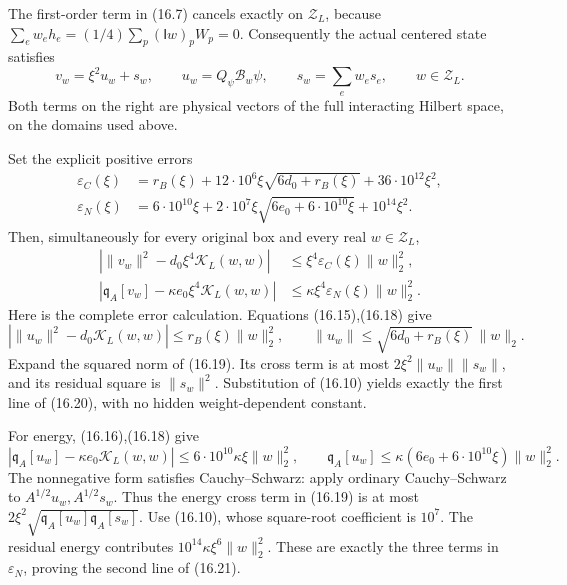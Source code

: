 \documentclass[
]{article}
\begin{document}
The first-order term in (16.7) cancels exactly on \(\mathscr Z_L\),
because \(\sum_e w_eh_e=(1/4)\sum_p(\mathsf Iw)_pW_p=0\). Consequently
the actual centered state satisfies \[
v_w=\xi^2u_w+s_w,\qquad
u_w=Q_\psi\mathcal B_w\psi,\qquad
s_w=\sum_e w_es_e,\qquad w\in\mathscr Z_L.                   \tag{16.19}
\] Both terms on the right are physical vectors of the full interacting
Hilbert space, on the domains used above.

Set the explicit positive errors \[
\begin{split}
\varepsilon_C(\xi)
 &=r_B(\xi)+12\cdot10^6\xi\sqrt{6d_0+r_B(\xi)}
                              +36\cdot10^{12}\xi^2,\\
\varepsilon_N(\xi)
 &=6\cdot10^{10}\xi
   +2\cdot10^7\xi\sqrt{6e_0+6\cdot10^{10}\xi}
                              +10^{14}\xi^2.
\end{split}                                                  \tag{16.20}
\] Then, simultaneously for every original box and every real
\(w\in\mathscr Z_L\), \[
\begin{split}
\left|\|v_w\|^2-d_0\xi^4\mathcal K_L(w,w)\right|
 &\le\xi^4\varepsilon_C(\xi)\|w\|_2^2,\\
\left|\mathfrak q_A[v_w]
             -\kappa e_0\xi^4\mathcal K_L(w,w)\right|
 &\le\kappa\xi^4\varepsilon_N(\xi)\|w\|_2^2 .
\end{split}                                                  \tag{16.21}
\] Here is the complete error calculation. Equations (16.15),(16.18)
give \[
\left|\|u_w\|^2-d_0\mathcal K_L(w,w)\right|
\le r_B(\xi)\|w\|_2^2,\qquad
\|u_w\|\le\sqrt{6d_0+r_B(\xi)}\,\|w\|_2.
\] Expand the squared norm of (16.19). Its cross term is at most
\(2\xi^2\|u_w\|\|s_w\|\), and its residual square is \(\|s_w\|^2\).
Substitution of (16.10) yields exactly the first line of (16.20), with
no hidden weight-dependent constant.

For energy, (16.16),(16.18) give \[
\left|\mathfrak q_A[u_w]-\kappa e_0\mathcal K_L(w,w)\right|
 \le6\cdot10^{10}\kappa\xi\|w\|_2^2,\qquad
\mathfrak q_A[u_w]\le
 \kappa(6e_0+6\cdot10^{10}\xi)\|w\|_2^2.
\] The nonnegative form satisfies Cauchy--Schwarz: apply ordinary
Cauchy--Schwarz to \(A^{1/2}u_w,A^{1/2}s_w\). Thus the energy cross term
in (16.19) is at most
\(2\xi^2\sqrt{\mathfrak q_A[u_w]\mathfrak q_A[s_w]}\). Use (16.10),
whose square-root coefficient is \(10^7\). The residual energy
contributes \(10^{14}\kappa\xi^6\|w\|_2^2\). These are exactly the three
terms in \(\varepsilon_N\), proving the second line of (16.21).
\end{document}
